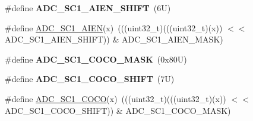 \begin{DoxyCompactItemize}
\#define {\bfseries A\+D\+C\+\_\+\+S\+C1\+\_\+\+A\+I\+E\+N\+\_\+\+S\+H\+I\+FT}~(6\+U)
\item 
\#define \mbox{\hyperlink{group___a_d_c___register___masks_ga63500f6af77c0494e67395a35716285b}{A\+D\+C\+\_\+\+S\+C1\+\_\+\+A\+I\+EN}}(x)~(((uint32\+\_\+t)(((uint32\+\_\+t)(x)) $<$$<$ A\+D\+C\+\_\+\+S\+C1\+\_\+\+A\+I\+E\+N\+\_\+\+S\+H\+I\+FT)) \& A\+D\+C\+\_\+\+S\+C1\+\_\+\+A\+I\+E\+N\+\_\+\+M\+A\+SK)
\item 
\mbox{\label{group___a_d_c___register___masks_ga698a3a178a5b412febc8c0cc849e8896}} 
\#define {\bfseries A\+D\+C\+\_\+\+S\+C1\+\_\+\+C\+O\+C\+O\+\_\+\+M\+A\+SK}~(0x80\+U)
\item 
\mbox{\label{group___a_d_c___register___masks_gad708b138ec734a371a20a990f0c9a27f}} 
\#define {\bfseries A\+D\+C\+\_\+\+S\+C1\+\_\+\+C\+O\+C\+O\+\_\+\+S\+H\+I\+FT}~(7\+U)
\item 
\#define \mbox{\hyperlink{group___a_d_c___register___masks_ga9393e3e7b4f420e8871e93d81302ddef}{A\+D\+C\+\_\+\+S\+C1\+\_\+\+C\+O\+CO}}(x)~(((uint32\+\_\+t)(((uint32\+\_\+t)(x)) $<$$<$ A\+D\+C\+\_\+\+S\+C1\+\_\+\+C\+O\+C\+O\+\_\+\+S\+H\+I\+FT)) \& A\+D\+C\+\_\+\+S\+C1\+\_\+\+C\+O\+C\+O\+\_\+\+M\+A\+SK)
\end{DoxyCompactItemize}
